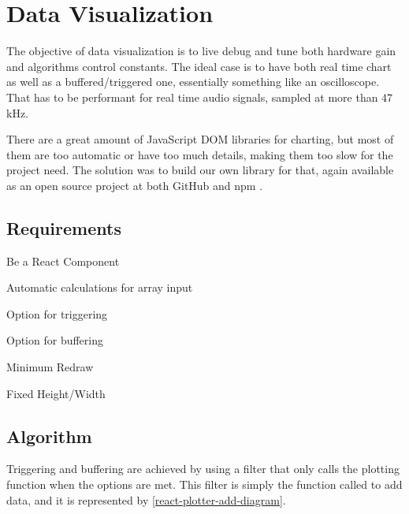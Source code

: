 \section{Data Visualization}
\label{data-visualization}

The objective of data visualization is to live debug and tune both hardware gain
and algorithms control constants. The ideal case is to have both real time chart
as well as a buffered/triggered one, essentially something like an oscilloscope.
That has to be performant for real time audio signals, sampled at more than 47 kHz.

There are a great amount of JavaScript DOM libraries for charting, but most of
them are too automatic or have too much details, making them too slow for the project need.
The solution was to build our own library for that, again available as an open source
project at both GitHub and npm \cite{react-plotter}.

\subsection{Requirements}
\label{data-visualization-requirements}
\begin{itemlist}
  \item Be a React Component
  \item Automatic calculations for array input
  \item Option for triggering
  \item Option for buffering
  \item Minimum Redraw
  \item Fixed Height/Width
\end{itemlist}

\subsection{Algorithm}
Triggering and buffering are achieved by using a filter that only calls the plotting
function when the options are met. This filter is simply the function called to
add data, and it is represented by \autoref{react-plotter-add-diagram}. 

